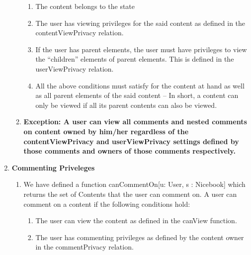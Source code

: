 \documentclass[titlepage]{article}
\begin{document}
\begin{enumerate}
\begin{enumerate}
	      \begin{enumerate}
		      \item The content belongs to the state
		      \item The user has viewing privileges for the said content as defined in the contentViewPrivacy relation.
		      \item If the user has parent elements, the user must have privileges to view the “children” elements of parent elements. This is defined in the userViewPrivacy relation.
		      \item All the above conditions must satisfy for the content at hand as well as all parent elements of the said content – In short, a content can only be viewed if all its parent contents can also be viewed.
	      \end{enumerate}
	      \item\textbf{Exception: A user can view all comments and nested comments on content owned by him/her regardless of the contentViewPrivacy and userViewPrivacy settings defined by those comments and owners of those comments respectively.}
\end{enumerate}
\item\textbf{Commenting Priveleges}
\begin{enumerate}
\item We have defined a function canCommentOn[u: User, s : Nicebook] which returns the set of Contents that the user can comment on. A user can comment on a content if the following conditions hold:
\begin{enumerate}
	\item The user can view the content as defined in the canView function.
	\item The user has commenting privileges as defined by the content owner in the commentPrivacy relation.


\end{enumerate}
\end{enumerate}
\end{enumerate}
\end{document}
